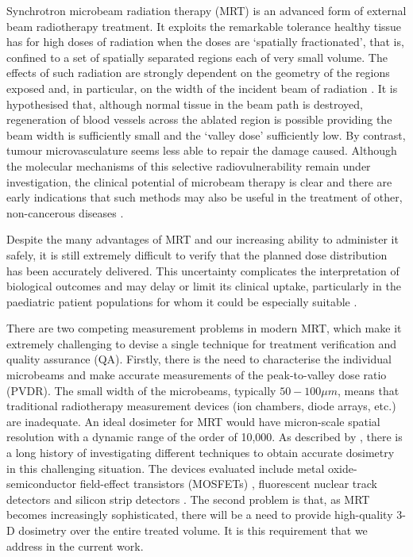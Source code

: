 	
	Synchrotron microbeam radiation therapy (MRT) is an advanced form of external beam radiotherapy treatment. It exploits the remarkable tolerance healthy tissue has for high doses of radiation when the doses are `spatially fractionated', that is, confined to a set of spatially separated regions each of very small volume. The effects of such radiation are strongly dependent on the geometry of the regions exposed and, in particular, on the width of the incident beam of radiation \cite{brauer-krischeffects2010}. It is hypothesised that, although normal tissue in the beam path is destroyed, regeneration of blood vessels across the ablated region is possible providing the beam width is sufficiently small and the `valley dose' sufficiently low. By contrast, tumour microvasculature seems less able to repair the damage caused. Although the molecular mechanisms of this selective radiovulnerability remain under investigation, the clinical potential of microbeam therapy is clear \cite{crosbie2010tumor} and there are early indications that such methods may also be useful in the treatment of other, non-cancerous diseases \cite{pouyatos2013synchrotron}.
	
	Despite the many advantages of MRT and our increasing ability to administer it safely, it is still extremely difficult to verify that the planned dose distribution has been accurately delivered. This uncertainty complicates the interpretation of biological outcomes and may delay or limit its clinical uptake, particularly in the paediatric patient populations for whom it could be especially suitable \cite{laissue2001weanling}.
	
	There are two competing measurement problems in modern MRT, which make it extremely challenging to devise a single technique for treatment verification and quality assurance (QA). Firstly, there is the need to characterise the individual microbeams and make accurate measurements of the peak-to-valley dose ratio (PVDR). The small width of the microbeams, typically $50-100\mu m$, means that traditional radiotherapy measurement devices (ion chambers, diode arrays, etc.) are inadequate. An ideal dosimeter for MRT would have micron-scale spatial resolution with a dynamic range of the order of 10,000. As described by \cite{brauer-krischpotential2010}, there is a long history of investigating different techniques to obtain accurate dosimetry in this challenging situation. The devices evaluated include metal oxide-semiconductor field-effect transistors (MOSFETs) \cite{brauer2003mosfet, siegbahnmosfet2009}, fluorescent nuclear track detectors \cite{akselrod2006novel} and silicon strip detectors \cite{lerch2011dosimetry}. The second problem is that, as MRT becomes increasingly sophisticated, there will be a need to provide high-quality 3-D dosimetry over the entire treated volume. It is this requirement that we address in the current work.
	
